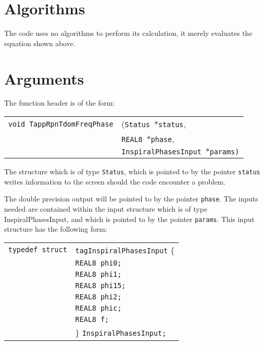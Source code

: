 \documentclass[12pt]{article}
\begin{document}
\section{Algorithms}

The code uses no algorithms to perform its calculation, it merely evaluates the equation shown above.


\section{Arguments}

The function header is of the form:

\vspace{5mm}

\begin{tabular}{ll}
\texttt{void TappRpnTdomFreqPhase} & (\texttt{Status $\ast$status}, \\
                        & \texttt{REAL8 $\ast$phase}, \\
                        & \texttt{InspiralPhasesInput $\ast$params)} 
\end{tabular}

\vspace{5mm}

The structure which is of type \texttt{Status}, which is pointed to by the pointer \texttt{status} writes information to the screen should the code encounter a problem. 

The double precision output will be pointed to by the pointer \texttt{phase}.
The inputs needed are contained within the input structure which is of type InspiralPhasesInput, and which is pointed to by the pointer \texttt{params}. This input structure has the following form:

\vspace{5mm}

\begin{tabular}{ll}
\texttt{typedef struct} & \texttt{tagInspiralPhasesInput} \{ \\
                        & \texttt{REAL8 phi0;} \\
                        & \texttt{REAL8 phi1;} \\
                        & \texttt{REAL8 phi15;} \\
                        & \texttt{REAL8 phi2;} \\
                        & \texttt{REAL8 phic;} \\
                        & \texttt{REAL8 f;} \\
                        & \} \texttt{InspiralPhasesInput;}
\end{tabular}
\end{document}
